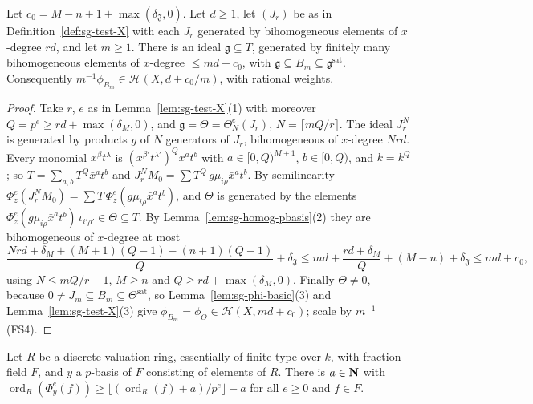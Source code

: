 \begin{proposition}\label{prop:sg-uniform-generation}
\leanok
{}
Let $c_0=M-n+1+\max(\delta_{\mathfrak J},0)$. Let $d\ge1$, let $(J_r)$ be as in Definition~\ref{def:sg-test-X} with each $J_r$ generated by bihomogeneous
elements of $x$-degree $rd$, and let $m\ge1$. There is an ideal $\mathfrak g\subseteq T$, generated by finitely many bihomogeneous elements of $x$-degree
$\le md+c_0$, with $\mathfrak g\subseteq B_m\subseteq\mathfrak g^{\mathrm{sat}}$. Consequently $m^{-1}\phi_{B_m}\in\mathcal H(X,d+c_0/m)$, with rational weights.
\end{proposition}

\begin{proof}
Take $r$, $e$ as in Lemma~\ref{lem:sg-test-X}(1) with moreover $Q=p^e\ge rd+\max(\delta_M,0)$, and $\mathfrak g=\Theta=\Theta^e_N(J_r)$, $N=\lceil mQ/r\rceil$.
The ideal $J_r^N$ is generated by products $g$ of $N$ generators of $J_r$, bihomogeneous of $x$-degree $Nrd$. Every monomial $x^\beta t^\lambda$ is
$(x^{\beta'}t^{\lambda'})^Qx^at^b$ with $a\in[0,Q)^{M+1}$, $b\in[0,Q)$, and $k=k^Q$; so $T=\sum_{a,b}T^Q\bar x^at^b$ and
$J_r^NM_0=\sum T^Q\,g\mu_{i\rho}\bar x^at^b$. By semilinearity $\Phi^e_z(J_r^NM_0)=\sum T\,\Phi^e_z(g\mu_{i\rho}\bar x^at^b)$, and $\Theta$ is generated by the
elements $\Phi^e_z(g\mu_{i\rho}\bar x^at^b)\,\iota_{i'\rho'}\in\Theta\subseteq T$. By Lemma~\ref{lem:sg-homog-pbasis}(2) they are bihomogeneous of $x$-degree at
most
\[
\frac{Nrd+\delta_M+(M+1)(Q-1)-(n+1)(Q-1)}Q+\delta_{\mathfrak J}\le md+\frac{rd+\delta_M}Q+(M-n)+\delta_{\mathfrak J}\le md+c_0,
\]
using $N\le mQ/r+1$, $M\ge n$ and $Q\ge rd+\max(\delta_M,0)$. Finally $\Theta\ne0$, because $0\ne J_m\subseteq B_m\subseteq\Theta^{\mathrm{sat}}$, so
Lemma~\ref{lem:sg-phi-basic}(3) and Lemma~\ref{lem:sg-test-X}(3) give $\phi_{B_m}=\phi_\Theta\in\mathcal H(X,md+c_0)$; scale by $m^{-1}$ (FS4).
\end{proof}

\begin{lemma}\label{lem:sg-trace-estimate}
\leanok
{}
Let $R$ be a discrete valuation ring, essentially of finite type over $k$, with fraction field $F$, and $y$ a $p$-basis of $F$ consisting of elements
of $R$. There is $a\in\mathbf{N}$ with $\operatorname{ord}_R(\Phi^e_y(f))\ge\lfloor(\operatorname{ord}_R(f)+a)/p^e\rfloor-a$ for all $e\ge0$ and $f\in F$.
\end{lemma}

